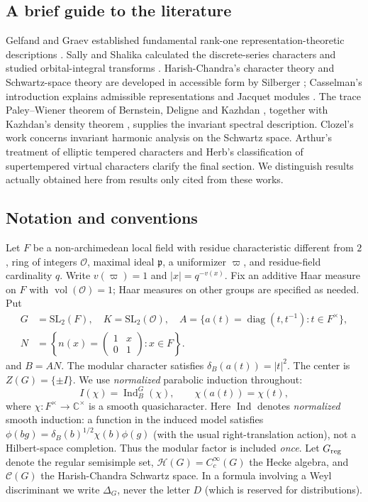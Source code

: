 \documentclass[12pt,letterpaper]{amsart}
\numberwithin{equation}{section}
\theoremstyle{definition}
\theoremstyle{remark}
\newcommand{\calH}{\mathcal H}
\newcommand{\calC}{\mathcal C}
\newcommand{\vol}{\operatorname{vol}}
\newcommand{\Ind}{\operatorname{Ind}}
\newcommand{\diag}{\operatorname{diag}}
\begin{document}
\subsection{A brief guide to the literature}\label{sec:lit}
Gelfand and Graev established fundamental rank-one representation-theoretic descriptions \cite{GG63}.  Sally and Shalika calculated the discrete-series characters and studied orbital-integral transforms \cite{SS68,SS84}.  Harish-Chandra's character theory and Schwartz-space theory are developed in accessible form by Silberger \cite{Si79}; Casselman's introduction explains admissible representations and Jacquet modules \cite{CaNotes}.  The trace Paley--Wiener theorem of Bernstein, Deligne and Kazhdan \cite{BDK86}, together with Kazhdan's density theorem \cite{Ka86}, supplies the invariant spectral description.  Clozel's work \cite{Cl91} concerns invariant harmonic analysis on the Schwartz space.  Arthur's treatment of elliptic tempered characters \cite{Ar93} and Herb's classification of supertempered virtual characters \cite{He94} clarify the final section.  We distinguish results actually obtained here from results only cited from these works.

\subsection{Notation and conventions}\label{sec:notation}
Let $F$ be a non-archimedean local field with residue characteristic different from $2$, ring of integers $\mathcal O$, maximal ideal $\mathfrak p$, a uniformizer $\varpi$, and residue-field cardinality $q$.  Write $v(\varpi)=1$ and $|x|=q^{-v(x)}$.  Fix an additive Haar measure on $F$ with $\vol(\mathcal O)=1$; Haar measures on other groups are specified as needed. Put
\[
\begin{aligned}
G&=\mathrm{SL}_2(F),\quad K=\mathrm{SL}_2(\mathcal O),\quad
A=\{a(t)=\diag(t,t^{-1}):t\in F^\times\},\\
N&=\left\{n(x)=\begin{pmatrix}1&x\\0&1\end{pmatrix}:x\in F\right\}.
\end{aligned}
\]
and $B=AN$.  The modular character satisfies $\delta_B(a(t))=|t|^2$.  The center is $Z(G)=\{\pm I\}$. We use \emph{normalized} parabolic induction throughout:
\begin{equation}\label{eq:induction}
I(\chi)=\Ind_B^G(\chi),\qquad
\chi(a(t))=\chi(t),
\end{equation}
where $\chi:F^\times\to\mathbb C^\times$ is a smooth quasicharacter. Here $\Ind$ denotes \emph{normalized} smooth induction: a function in the induced model satisfies $\phi(bg)=\delta_B(b)^{1/2}\chi(b)\phi(g)$ (with the usual right-translation action), not a Hilbert-space completion. Thus the modular factor is included \emph{once}. Let $G_{\rm reg}$ denote the regular semisimple set, $\calH(G)=C_c^\infty(G)$ the Hecke algebra, and $\calC(G)$ the Harish-Chandra Schwartz space.  In a formula involving a Weyl discriminant we write $\Delta_G$, never the letter $D$ (which is reserved for distributions).
\end{document}
